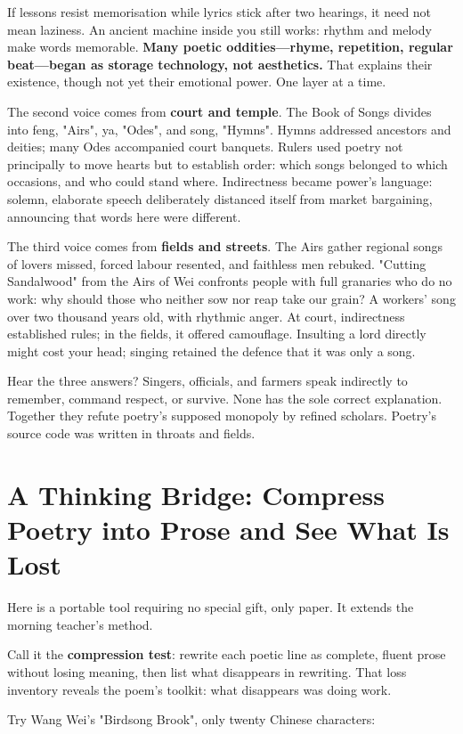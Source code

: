 If lessons resist memorisation while lyrics stick after two hearings, it need not mean laziness. An ancient machine inside you still works: rhythm and melody make words memorable. \textbf{Many poetic oddities---rhyme, repetition, regular beat---began as storage technology, not aesthetics.} That explains their existence, though not yet their emotional power. One layer at a time.

The second voice comes from \textbf{court and temple}. The Book of Songs divides into feng, "Airs", ya, "Odes", and song, "Hymns". Hymns addressed ancestors and deities; many Odes accompanied court banquets. Rulers used poetry not principally to move hearts but to establish order: which songs belonged to which occasions, and who could stand where. Indirectness became power's language: solemn, elaborate speech deliberately distanced itself from market bargaining, announcing that words here were different.

The third voice comes from \textbf{fields and streets}. The Airs gather regional songs of lovers missed, forced labour resented, and faithless men rebuked. "Cutting Sandalwood" from the Airs of Wei confronts people with full granaries who do no work: why should those who neither sow nor reap take our grain? A workers' song over two thousand years old, with rhythmic anger. At court, indirectness established rules; in the fields, it offered camouflage. Insulting a lord directly might cost your head; singing retained the defence that it was only a song.

Hear the three answers? Singers, officials, and farmers speak indirectly to remember, command respect, or survive. None has the sole correct explanation. Together they refute poetry's supposed monopoly by refined scholars. Poetry's source code was written in throats and fields.

\section[Thinking Bridge: Poetry into Prose]{A Thinking Bridge: Compress Poetry into Prose and See What Is Lost}
Here is a portable tool requiring no special gift, only paper. It extends the morning teacher's method.

Call it the \textbf{compression test}: rewrite each poetic line as complete, fluent prose without losing meaning, then list what disappears in rewriting. That loss inventory reveals the poem's toolkit: what disappears was doing work.

Try Wang Wei's "Birdsong Brook", only twenty Chinese characters:


